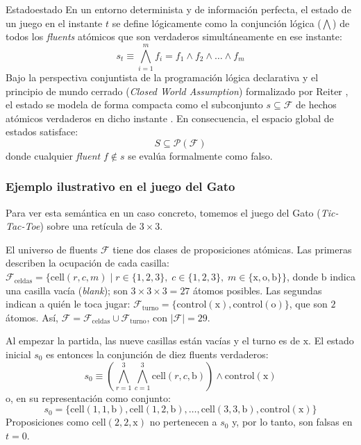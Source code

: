 \begin{definicion}{Estado}{estado}
En un entorno determinista y de información perfecta, el estado de un juego en el instante $t$ se define lógicamente como la conjunción lógica ($\bigwedge$) de todos los \textit{fluents} atómicos que son verdaderos simultáneamente en ese instante:
\begin{equation*}
    s_t \equiv \bigwedge_{i=1}^m f_i = f_1 \land f_2 \land \dots \land f_m
\end{equation*}
Bajo la perspectiva conjuntista de la programación lógica declarativa y el principio de mundo cerrado (\textit{Closed World Assumption}) formalizado por Reiter \cite{Reiter1978CWA}, el estado se modela de forma compacta como el subconjunto $s \subseteq \mathcal{F}$ de hechos atómicos verdaderos en dicho instante \cite{GeneserethThielscher2014, Love2008GDL}. En consecuencia, el espacio global de estados satisface:
\begin{equation*}
    S \subseteq \mathcal{P}(\mathcal{F})
\end{equation*}
donde cualquier \textit{fluent} $f \notin s$ se evalúa formalmente como falso.
\end{definicion}

\subsubsection{Ejemplo ilustrativo en el juego del Gato}

Para ver esta semántica en un caso concreto, tomemos el juego del Gato (\textit{Tic-Tac-Toe}) sobre una retícula de $3 \times 3$.

El universo de fluents $\mathcal{F}$ tiene dos clases de proposiciones atómicas. Las primeras describen la ocupación de cada casilla: $\mathcal{F}_{\text{celdas}} = \{\text{cell}(r, c, m) \mid r \in \{1,2,3\}, \; c \in \{1,2,3\}, \; m \in \{\text{x}, \text{o}, \text{b}\}\}$, donde $\text{b}$ indica una casilla vacía (\textit{blank}); son $3 \times 3 \times 3 = 27$ átomos posibles. Las segundas indican a quién le toca jugar: $\mathcal{F}_{\text{turno}} = \{\text{control}(\text{x}), \text{control}(\text{o})\}$, que son $2$ átomos. Así, $\mathcal{F} = \mathcal{F}_{\text{celdas}} \cup \mathcal{F}_{\text{turno}}$, con $|\mathcal{F}| = 29$.

Al empezar la partida, las nueve casillas están vacías y el turno es de $\text{x}$. El estado inicial $s_0$ es entonces la conjunción de diez fluents verdaderos:
\begin{equation}
    s_0 \equiv \left( \bigwedge_{r=1}^3 \bigwedge_{c=1}^3 \text{cell}(r, c, \text{b}) \right) \land \text{control}(\text{x})
    \label{eq:estado-inicial-fluents}
\end{equation}
o, en su representación como conjunto:
\begin{equation}
    s_0 = \{\text{cell}(1,1,\text{b}), \text{cell}(1,2,\text{b}), \dots, \text{cell}(3,3,\text{b}), \text{control}(\text{x})\}
    \label{eq:estado-inicial-conjunto}
\end{equation}
Proposiciones como $\text{cell}(2,2,\text{x})$ no pertenecen a $s_0$ y, por lo tanto, son falsas en $t = 0$.


